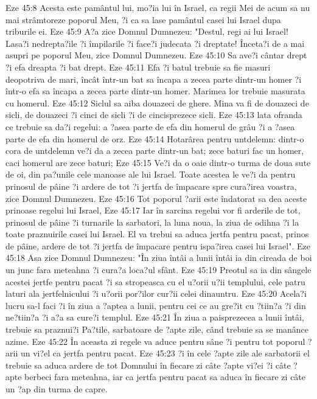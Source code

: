 Eze 45:8  Acesta este pamântul lui, mo?ia lui în Israel, ca regii Mei de acum sa nu mai strâmtoreze poporul Meu, ?i ca sa lase pamântul casei lui Israel dupa triburile ei.
Eze 45:9  A?a zice Domnul Dumnezeu: "Destul, regi ai lui Israel! Lasa?i nedrepta?ile ?i împilarile ?i face?i judecata ?i dreptate! Înceta?i de a mai asupri pe poporul Meu, zice Domnul Dumnezeu.
Eze 45:10  Sa ave?i cântar drept ?i efa dreapta ?i bat drept.
Eze 45:11  Efa ?i batul trebuie sa fie masuri deopotriva de mari, încât într-un bat sa încapa a zecea parte dintr-un homer ?i într-o efa sa încapa a zecea parte dintr-un homer. Marimea lor trebuie masurata cu homerul.
Eze 45:12  Siclul sa aiba douazeci de ghere. Mina va fi de douazeci de sicli, de douazeci ?i cinci de sicli ?i de cincisprezece sicli.
Eze 45:13  lata ofranda ce trebuie sa da?i regelui: a ?asea parte de efa din homerul de grâu ?i a ?asea parte de efa din homerul de orz.
Eze 45:14  Hotarârea pentru untdelemn: dintr-o cora de untdelemn ve?i da a zecea parte dintr-un bat; zece baturi fac un homer, caci homerul are zece baturi;
Eze 45:15  Ve?i da o oaie dintr-o turma de doua sute de oi, din pa?unile cele manoase ale lui Israel. Toate acestea le ve?i da pentru prinosul de pâine ?i ardere de tot ?i jertfa de împacare spre cura?irea voastra, zice Domnul Dumnezeu.
Eze 45:16  Tot poporul ?arii este îndatorat sa dea aceste prinoase regelui lui Israel,
Eze 45:17  Iar în sarcina regelui vor fi arderile de tot, prinosul de pâine ?i turnarile la sarbatori, la luna noua, la ziua de odihna ?i la toate praznuirile casei lui Israel. El va trebui sa aduca jertfa pentru pacat, prinos de pâine, ardere de tot ?i jertfa de împacare pentru ispa?irea casei lui Israel".
Eze 45:18  Asa zice Domnul Dumnezeu: "În ziua întâi a lunii întâi ia din cireada de boi un junc fara meteahna ?i cura?a loca?ul sfânt.
Eze 45:19  Preotul sa ia din sângele acestei jertfe pentru pacat ?i sa stropeasca cu el u?orii u?ii templului, cele patru laturi ala jertfelnicului ?i u?orii por?ilor cur?ii celei dinauntru.
Eze 45:20  Acela?i lucru sa-l faci ?i în ziua a ?aptea a lunii, pentru cei ce au gre?it cu ?tiin?a ?i din ne?tiin?a ?i a?a sa cure?i templul.
Eze 45:21  În ziua a paisprezecea a lunii întâi, trebuie sa praznui?i Pa?tile, sarbatoare de ?apte zile, când trebuie sa se manânce azime.
Eze 45:22  În aceasta zi regele va aduce pentru sâne ?i pentru tot poporul ?arii un vi?el ca jertfa pentru pacat.
Eze 45:23  ?i în cele ?apte zile ale sarbatorii el trebuie sa aduca ardere de tot Domnului în fiecare zi câte ?apte vi?ei ?i câte ?apte berbeci fara meteahna, iar ca jertfa pentru pacat sa aduca în fiecare zi câte un ?ap din turma de capre.
